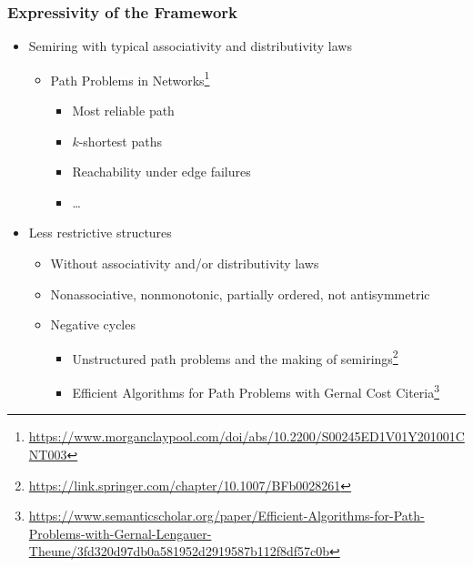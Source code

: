 \documentclass[xcolor=table,aspectratio=169]{beamer}
\begin{document}
\begin{frame}[fragile]
  \frametitle{Expressivity of the Framework}      
    \begin{itemize}                  
        \item Semiring with typical associativity and distributivity laws 
        \begin{itemize}
          \item Path Problems in Networks\footnote{\url{https://www.morganclaypool.com/doi/abs/10.2200/S00245ED1V01Y201001CNT003}}
          \begin{itemize}
            \item Most reliable path
            \item $k$-shortest paths
            \item Reachability under edge failures
            \item \ldots
          \end{itemize}
        \end{itemize}
        \item Less restrictive structures
        \begin{itemize}
          \item Without associativity and/or distributivity laws
          \item Nonassociative, nonmonotonic, partially ordered, not antisymmetric
          \item Negative cycles
          \begin{itemize}
            \item Unstructured path problems and the making of semirings\footnote{\url{https://link.springer.com/chapter/10.1007/BFb0028261}}
        \item Efficient Algorithms for Path Problems with Gernal Cost Citeria\footnote{\url{https://www.semanticscholar.org/paper/Efficient-Algorithms-for-Path-Problems-with-Gernal-Lengauer-Theune/3fd320d97db0a581952d2919587b112f8df57c0b}}        
          \end{itemize}
        \end{itemize}         
    \end{itemize}
\end{frame}
\end{document}
